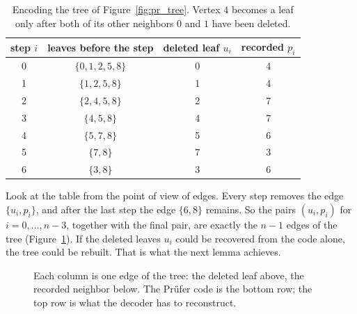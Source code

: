 \documentclass[11pt]{article}
\begin{document}
\begin{table}[H]
\centering\small\sffamily
\begin{tabular}{@{}cccc@{}}
\toprule
step $i$ & leaves before the step & deleted leaf $u_i$ & recorded $p_i$\\
\midrule
0 & $\{0,1,2,5,8\}$ & 0 & 4\\
1 & $\{1,2,5,8\}$   & 1 & 4\\
2 & $\{2,4,5,8\}$   & 2 & 7\\
3 & $\{4,5,8\}$     & 4 & 7\\
4 & $\{5,7,8\}$     & 5 & 6\\
5 & $\{7,8\}$       & 7 & 3\\
6 & $\{3,8\}$       & 3 & 6\\
\bottomrule
\end{tabular}
\caption{Encoding the tree of Figure~\ref{fig:pr_tree}. Vertex $4$ becomes a
leaf only after both of its other neighbors $0$ and $1$ have been
deleted.}\label{tab:pr_trace}
\end{table}

Look at the table from the point of view of edges. Every step removes the
edge $\{u_i,p_i\}$, and after the last step the edge $\{6,8\}$ remains.
So the pairs $(u_i,p_i)$ for $i=0,\dots,n-3$, together with the final
pair, are exactly the $n-1$ edges of the tree
(Figure~\ref{fig:pr_tape}). If the deleted leaves $u_i$ could be
recovered from the code alone, the tree could be rebuilt. That is what the
next lemma achieves.

\begin{figure}[H]
\centering
{}
\caption{Each column is one edge of the tree: the deleted leaf above, the
recorded neighbor below. The Prüfer code is the bottom row; the top row
is what the decoder has to reconstruct.}\label{fig:pr_tape}
\end{figure}
\end{document}
